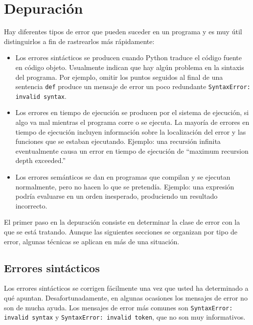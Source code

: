 
\chapter{Depuración }


Hay diferentes tipos de error que pueden suceder en un programa y
es muy útil distinguirlos a fin de rastrearlos más rápidamente:
\begin{itemize}
\item Los errores sintácticos se producen cuando Python traduce el código
fuente en código objeto. Usualmente indican que hay algún problema
en la sintaxis del programa. Por ejemplo, omitir los puntos seguidos
al final de una sentencia \texttt{def} produce un mensaje de error
un poco redundante \texttt{SyntaxError: invalid syntax}.
\item Los errores en tiempo de ejecución se producen por el sistema de ejecución,
si algo va mal mientras el programa corre o se ejecuta. La mayoría
de errores en tiempo de ejecución incluyen información sobre la localización
del error y las funciones que se estaban ejecutando. Ejemplo: una
recursión infinita eventualmente causa un error en tiempo de ejecución
de ``maximum recursion depth exceeded.''
\item Los errores semánticos se dan en programas que compilan y se ejecutan
normalmente, pero no hacen lo que se pretendía. Ejemplo: una expresión
podría evaluarse en un orden inesperado, produciendo un resultado
incorrecto.
\end{itemize}
 
  
  

El primer paso en la depuración consiste en determinar la clase de
error con la que se está tratando. Aunque las siguientes secciones
se organizan por tipo de error, algunas técnicas se aplican en más
de una situación.

\section{Errores sintácticos}

 

Los errores sintácticos se corrigen fácilmente una vez que usted ha
determinado a qué apuntan. Desafortunadamente, en algunas ocasiones
los mensajes de error no son de mucha ayuda. Los mensajes de error
más comunes son \texttt{SyntaxError: invalid syntax} y \texttt{SyntaxError: invalid
token}, que no son muy informativos.


